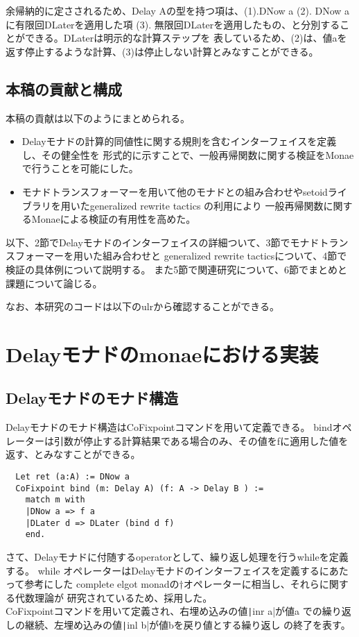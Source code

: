 \documentclass[japanese]{jssst_ppl}
\theoremstyle{definition}
\begin{document}
余帰納的に定さされるため、Delay Aの型を持つ項は、(1).DNow a (2). DNow aに有限回DLaterを適用した項
(3). 無限回DLaterを適用したもの、と分別することができる。DLaterは明示的な計算ステップを
表しているため、(2)は、値aを返す停止するような計算、(3)は停止しない計算とみなすことができる。

\subsection{本稿の貢献と構成}
本稿の貢献は以下のようにまとめられる。
\begin{itemize}
  \item Delayモナドの計算的同値性に関する規則を含むインターフェイスを定義し、その健全性を
        形式的に示すことで、一般再帰関数に関する検証をMonaeで行うことを可能にした。
  \item モナドトランスフォーマーを用いて他のモナドとの組み合わせやsetoidライブラリを用いたgeneralized rewrite tactics の利用により
        一般再帰関数に関するMonaeによる検証の有用性を高めた。
\end{itemize}

以下、2節でDelayモナドのインターフェイスの詳細ついて、3節でモナドトランスフォーマーを用いた組み合わせと
generalized rewrite tacticsについて、4節で検証の具体例について説明する。
また5節で関連研究について、6節でまとめと課題について論じる。

なお、本研究のコードは以下のulrから確認することができる。



\section{Delayモナドのmonaeにおける実装}


\subsection{Delayモナドのモナド構造}

Delayモナドのモナド構造はCoFixpointコマンドを用いて定義できる。
bindオペレーターは引数が停止する計算結果である場合のみ、その値をfに適用した値を返す、とみなすことができる。
\begin{verbatim}
  Let ret (a:A) := DNow a
  CoFixpoint bind (m: Delay A) (f: A -> Delay B ) :=
    match m with
    |DNow a => f a
    |DLater d => DLater (bind d f)
    end.
                \end{verbatim}

さて、Delayモナドに付随するoperatorとして、繰り返し処理を行うwhileを定義する。
while オペレーターはDelayモナドのインターフェイスを定義するにあたって参考にした
complete elgot monadの$\dagger$オペレーターに相当し、それらに関する代数理論が
研究されているため、採用した。\\
CoFixpointコマンドを用いて定義され、右埋め込みの値\texttt|inr a|が値a
での繰り返しの継続、左埋め込みの値\texttt|inl b|が値bを戻り値とする繰り返し
の終了を表す。
\end{document}
